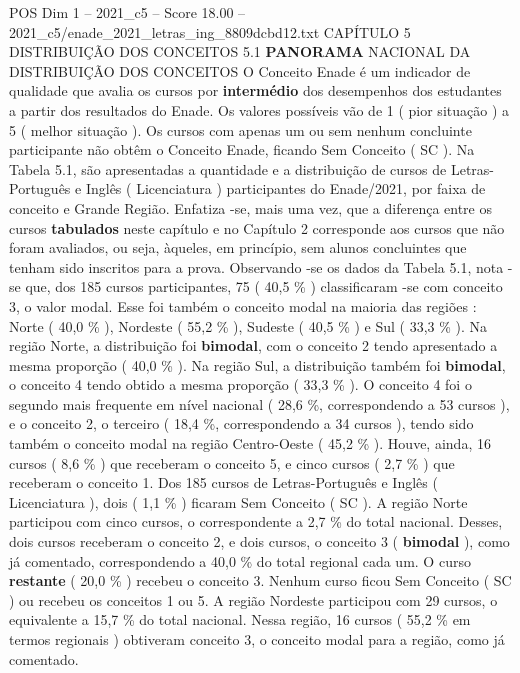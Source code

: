 \begin{textsample}{POS Dim 1 – 2021\_c5 – Score 18.00 – 2021\_c5/enade\_2021\_letras\_ing\_8809dcbd12.txt}  \label{ex:f1_pos_039}
CAPÍTULO 5 DISTRIBUIÇÃO DOS CONCEITOS 5.1 \textbf{PANORAMA} NACIONAL DA DISTRIBUIÇÃO DOS CONCEITOS O Conceito Enade é um indicador de qualidade que avalia os cursos por \textbf{intermédio} dos desempenhos dos estudantes a partir dos resultados do Enade.
Os valores possíveis vão de 1 ( pior situação ) a 5 ( melhor situação ).
Os cursos com apenas um ou sem nenhum concluinte participante não obtêm o Conceito Enade, ficando Sem Conceito ( SC ).
Na Tabela 5.1, são apresentadas a quantidade e a distribuição de cursos de Letras-Português e Inglês ( Licenciatura ) participantes do Enade/2021, por faixa de conceito e Grande Região.
Enfatiza -se, mais uma vez, que a diferença entre os cursos \textbf{tabulados} neste capítulo e no Capítulo 2 corresponde aos cursos que não foram avaliados, ou seja, àqueles, em princípio, sem alunos concluintes que tenham sido inscritos para a prova.
Observando -se os dados da Tabela 5.1, nota -se que, dos 185 cursos participantes, 75 ( 40,5 \% ) classificaram -se com conceito 3, o valor modal.
Esse foi também o conceito modal na maioria das regiões : Norte ( 40,0 \% ), Nordeste ( 55,2 \% ), Sudeste ( 40,5 \% ) e Sul ( 33,3 \% ).
Na região Norte, a distribuição foi \textbf{bimodal}, com o conceito 2 tendo apresentado a mesma proporção ( 40,0 \% ).
Na região Sul, a distribuição também foi \textbf{bimodal}, o conceito 4 tendo obtido a mesma proporção ( 33,3 \% ).
O conceito 4 foi o segundo mais frequente em nível nacional ( 28,6 \%, correspondendo a 53 cursos ), e o conceito 2, o terceiro ( 18,4 \%, correspondendo a 34 cursos ), tendo sido também o conceito modal na região Centro-Oeste ( 45,2 \% ).
Houve, ainda, 16 cursos ( 8,6 \% ) que receberam o conceito 5, e cinco cursos ( 2,7 \% ) que receberam o conceito 1.
Dos 185 cursos de Letras-Português e Inglês ( Licenciatura ), dois ( 1,1 \% ) ficaram Sem Conceito ( SC ).
A região Norte participou com cinco cursos, o correspondente a 2,7 \% do total nacional.
Desses, dois cursos receberam o conceito 2, e dois cursos, o conceito 3 ( \textbf{bimodal} ), como já comentado, correspondendo a 40,0 \% do total regional cada um.
O curso \textbf{restante} ( 20,0 \% ) recebeu o conceito 3.
Nenhum curso ficou Sem Conceito ( SC ) ou recebeu os conceitos 1 ou 5.
A região Nordeste participou com 29 cursos, o equivalente a 15,7 \% do total nacional.
Nessa região, 16 cursos ( 55,2 \% em termos regionais ) obtiveram conceito 3, o conceito modal para a região, como já comentado.

\end{textsample}
